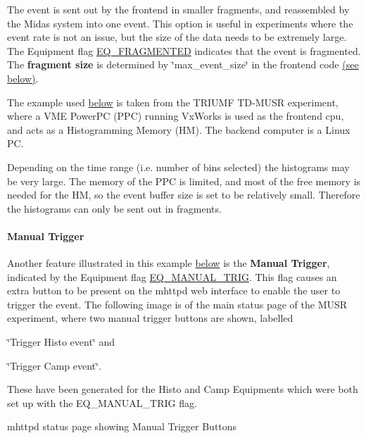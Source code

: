 The event is sent out by the frontend in smaller fragments, and reassembled by the Midas system into one event. This option is useful in experiments where the event rate is not an issue, but the size of the data needs to be extremely large. The Equipment flag \hyperlink{FE_table_FE_tbl_EqFragmented}{EQ\_\-FRAGMENTED} indicates that the event is fragmented. The {\bfseries fragment size} is determined by \char`\"{}max\_\-event\_\-size\char`\"{} in the frontend code \hyperlink{FE_eq_event_routines_FE_frag_max_event_size}{(see below)}.

The example used \hyperlink{FE_eq_event_routines_FE_tdmusr_equipment}{below} is taken from the TRIUMF TD-\/MUSR experiment, where a VME PowerPC (PPC) running VxWorks is used as the frontend cpu, and acts as a Histogramming Memory (HM). The backend computer is a Linux PC.

Depending on the time range (i.e. number of bins selected) the histograms may be very large. The memory of the PPC is limited, and most of the free memory is needed for the HM, so the event buffer size is set to be relatively small. Therefore the histograms can only be sent out in fragments.

\label{FE_eq_event_routines_idx_event_manual-trigger}
\hypertarget{FE_eq_event_routines_idx_event_manual-trigger}{}
 \hypertarget{FE_eq_event_routines_FE_manual_trigger}{}\paragraph{Manual Trigger}\label{FE_eq_event_routines_FE_manual_trigger}
Another feature illustrated in this example \hyperlink{FE_eq_event_routines_FE_tdmusr_equipment}{below} is the {\bfseries  Manual Trigger}, indicated by the Equipment flag \hyperlink{FE_table_FE_tbl_EqManTrig}{EQ\_\-MANUAL\_\-TRIG}. This flag causes an extra button to be present on the mhttpd web interface to enable the user to trigger the event. The following image is of the main status page of the MUSR experiment, where two manual trigger buttons are shown, labelled
\begin{DoxyItemize}
\item \char`\"{}Trigger Histo event\char`\"{} and
\item \char`\"{}Trigger Camp event\char`\"{}.
\end{DoxyItemize}

These have been generated for the Histo and Camp Equipments which were both set up with the EQ\_\-MANUAL\_\-TRIG flag. \par
 \begin{center} mhttpd status page showing Manual Trigger Buttons  \end{center}  \par


